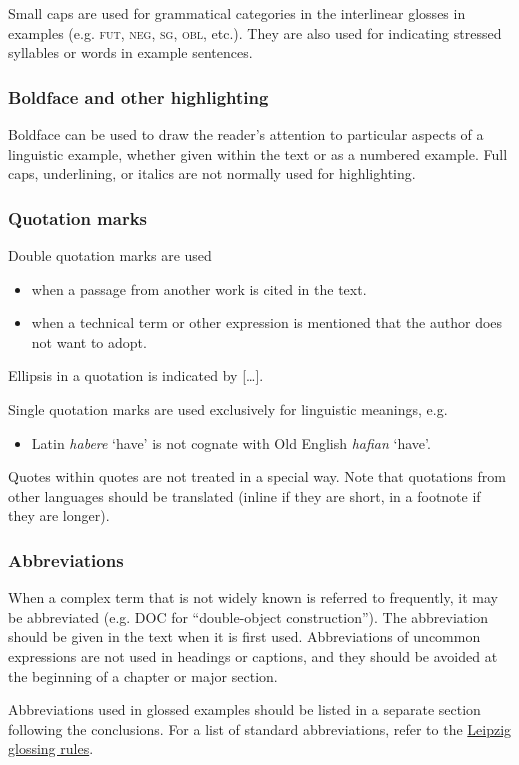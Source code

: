 \documentclass[charis,linguex]{glossa}
\begin{document}
Small caps are used for grammatical categories in the interlinear glosses in examples (e.g. \textsc{fut, neg, sg, obl}, etc.). They are also used for indicating stressed syllables or words in example sentences. 

\subsubsection{Boldface and other highlighting}
Boldface can be used to draw the reader’s attention to particular aspects of a linguistic example, whether given within the text or as a numbered example. Full caps, underlining, or italics are not normally used for highlighting.

\subsubsection{Quotation marks}
Double quotation marks are used

\begin{itemize}
\item when a passage from another work is cited in the text.
\item when a technical term or other expression is mentioned that the author does not want to adopt.
\end{itemize}
Ellipsis in a quotation is indicated by [\ldots].

Single quotation marks are used exclusively for linguistic meanings, e.g.
\begin{itemize}
\item Latin \textit{habere} ‘have’ is not cognate with Old English \textit{hafian} ‘have’.
\end{itemize}
Quotes within quotes are not treated in a special way.
Note that quotations from other languages should be translated (inline if they are short, in a footnote if they are longer).

\subsubsection{Abbreviations}
When a complex term that is not widely known is referred to frequently, it may be abbreviated (e.g. DOC for ``double-object construction''). The abbreviation should be given in the text when it is first used. Abbreviations of uncommon expressions are not used in headings or captions, and they should be avoided at the beginning of a chapter or major section.

Abbreviations used in glossed examples should be listed in a separate section following the conclusions. For a list of standard abbreviations, refer to the \href{https://www.eva.mpg.de/lingua/resources/glossing-rules.php}{Leipzig glossing rules}. 
\end{document}
